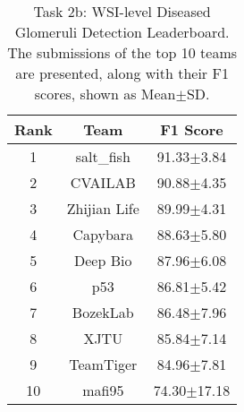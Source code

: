 \begin{table}[t]
\caption{Task 2b: WSI-level Diseased Glomeruli Detection Leaderboard. The submissions of the top 10 teams are presented, along with their F1 scores, shown as Mean$\pm$SD.}
\centering
\scriptsize
\setlength{\tabcolsep}{4mm}
\renewcommand\arraystretch{1}
\begin{tabular}{c|c|c}
\toprule
Rank & Team & F1 Score \\
\midrule
1 & salt\_fish & 91.33$\pm$3.84 \\
2 & CVAILAB & 90.88$\pm$4.35\\
3 & Zhijian Life & 89.99$\pm$4.31\\
4 & Capybara & 88.63$\pm$5.80\\
5 & Deep Bio & 87.96$\pm$6.08\\
6 & p53 & 86.81$\pm$5.42\\
7 & BozekLab & 86.48$\pm$7.96\\
8 & XJTU & 85.84$\pm$7.14\\
9 & TeamTiger & 84.96$\pm$7.81\\
10 & mafi95 & 74.30$\pm$17.18\\
\bottomrule
\end{tabular}
\label{tab:Task2Detection}
\end{table}
